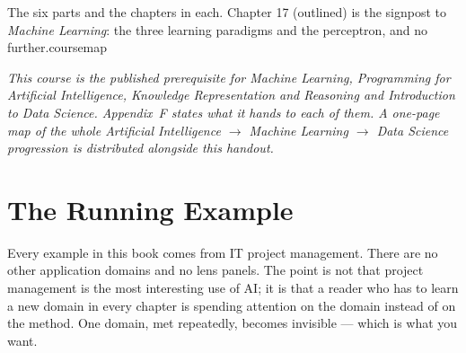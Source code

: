 {The six parts and the chapters in each. Chapter 17 (outlined) is the signpost to
\emph{Machine Learning}: the three learning paradigms and the perceptron, and no
further.}{coursemap}

\vspace{4pt}
{\small\itshape\color{gray!70!black}
This course is the published prerequisite for \emph{Machine Learning},
\emph{Programming for Artificial Intelligence}, \emph{Knowledge Representation and
Reasoning} and \emph{Introduction to Data Science}. Appendix~F states what it hands
to each of them. A one-page map of the whole
\emph{Artificial Intelligence $\rightarrow$ Machine Learning $\rightarrow$ Data
Science} progression is distributed alongside this handout.}

\newpage

\chapter*{The Running Example}

Every example in this book comes from IT project management. There are no other
application domains and no lens panels. The point is not that project management
is the most interesting use of AI; it is that a reader who has to learn a new
domain in every chapter is spending attention on the domain instead of on the
method. One domain, met repeatedly, becomes invisible --- which is what you want.

